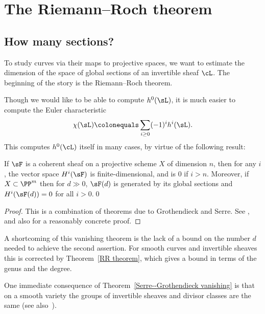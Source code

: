 

\chapter{The Riemann--Roch theorem}\label{RiemannRochChapter}

\section{How many sections?}

To study curves via their maps to projective spaces, we want to estimate the dimension of the space of global
sections of an invertible sheaf $\cL$. The beginning
of the story is the Riemann--Roch theorem.

Though we would like to be able to compute $h^0(\sL)$, it is much
easier to compute the 
Euler characteristic
%
$$
\chi(\sL)\colonequals \sum_{i\geq 0} (-1)^i h^i(\sL).
$$
This computes $h^0(\cL)$ itself in many cases, by virtue of the following result:

\begin{theorem}
\label{Serre--Grothendieck vanishing}
%
%
If $\sF$ is a coherent sheaf on a projective scheme $X$ of dimension $n$, then for any $i$, the vector space $H^i(\sF)$ is finite-dimensional, and is 0 if  $i> n$. Moreover,
if $X\subset \PP^m$ then for $d\gg 0$, $\sF(d)$ is generated by its global sections and $H^i(\sF(d)) = 0$ for all $i>0$.\qed
\unif
\end{theorem}

\begin{proof}
This is a combination of 
theorems due to Grothendieck and Serre. See
\cite[Theorems III.2.7 and III.5.2]{Hartshorne1977}, 
and
also \cite{Serre1955} for a 
reasonably
concrete proof.
\end{proof}

A 
shortcoming
of this vanishing theorem is the lack of a bound on the number $d$ needed to achieve the second assertion. For smooth curves
and invertible sheaves
this is corrected by Theorem~\ref{RR theorem}, which gives a bound in terms of the genus and the degree.

One immediate consequence of Theorem~\ref{Serre--Grothendieck vanishing} is that on a smooth variety the groups of invertible sheaves and divisor classes are the same (see also~\cite[Proposition II.6.13]{Hartshorne1977}).


